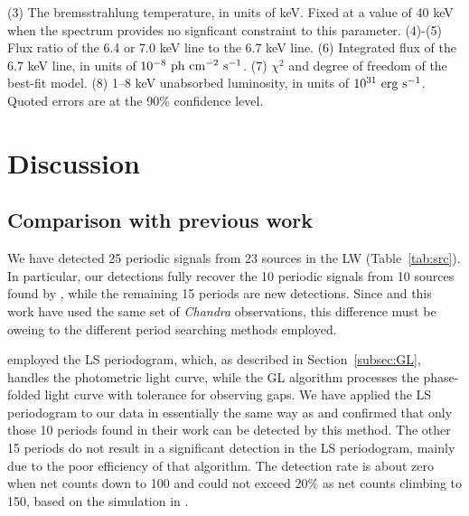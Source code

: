 \documentclass[fleqn,usenatbib]{mnras}
\begin{document}
\begin{table}
\begin{threeparttable}
\begin{tablenotes}
(3) The bremsstrahlung temperature, in units of keV. Fixed at a value of 40 keV when the spectrum provides no signficant constraint to this parameter.
 (4)-(5) Flux ratio of the 6.4 or 7.0 keV line to the 6.7 keV line.
 (6) Integrated flux of the 6.7 keV line, in units of $10^{-8}\rm~ph~cm^{-2}~s^{-1}$.
 (7) $\chi^2$ and degree of freedom of the best-fit model.
 (8) 1--8 keV unabsorbed luminosity, in units of $10^{31}\rm~erg~s^{-1}$. Quoted errors are at the 90\% confidence level.
\end{tablenotes} 
\end{threeparttable}
\end{table} 
 
%


\section{Discussion}\label{sec:discussion}
\subsection{Comparison with previous work} \label{subsec:compare}
We have detected 25 periodic signals from 23 sources in the LW (Table~\ref{tab:src}). 
In particular, our detections fully recover the 10 periodic signals from 10 sources found by  \cite{2012ApJ...746..165H}, while the remaining 15 periods are new detections. 
Since \cite{2012ApJ...746..165H} and this work have used the same set of {\it Chandra} observations, 
this difference must be oweing to the different period searching methods employed.

\cite{2012ApJ...746..165H} employed the LS periodogram,
which, as described in Section~\ref{subsec:GL}, handles the photometric light curve, while the GL algorithm processes the phase-folded light curve with tolerance for observing gaps. We have applied the LS periodogram to our data in essentially the same way as \cite{2012ApJ...746..165H} and confirmed that only those 10 periods found in their work can be detected by this method.  The other 15 periods do not result in a significant detection in the LS periodogram, mainly due to the poor efficiency of that algorithm. 
The detection rate is about zero when net counts down to 100 and could not exceed 20\% as net counts climbing to 150, based on the simulation in \cite{2012ApJ...746..165H}.
\end{document}
